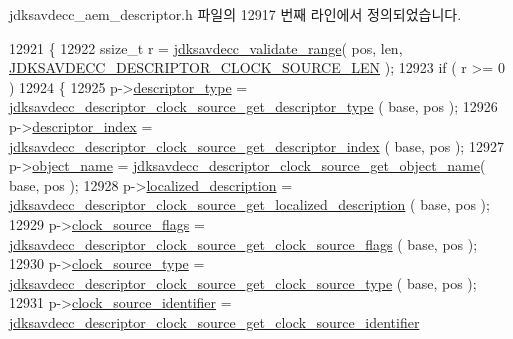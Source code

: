 jdksavdecc\+\_\+aem\+\_\+descriptor.\+h 파일의 12917 번째 라인에서 정의되었습니다.


\begin{DoxyCode}
12921 \{
12922     ssize\_t r = \hyperlink{group__util_ga9c02bdfe76c69163647c3196db7a73a1}{jdksavdecc\_validate\_range}( pos, len, 
      \hyperlink{group__descriptor__clock__source_ga66ee17894f56080a6071a858519f83cd}{JDKSAVDECC\_DESCRIPTOR\_CLOCK\_SOURCE\_LEN} );
12923     \textcolor{keywordflow}{if} ( r >= 0 )
12924     \{
12925         p->\hyperlink{structjdksavdecc__descriptor__clock__source_ab7c32b6c7131c13d4ea3b7ee2f09b78d}{descriptor\_type} = 
      \hyperlink{group__descriptor__clock__source_ga6c7920cb81e474c039654579add3f6f9}{jdksavdecc\_descriptor\_clock\_source\_get\_descriptor\_type}
      ( base, pos );
12926         p->\hyperlink{structjdksavdecc__descriptor__clock__source_a042bbc76d835b82d27c1932431ee38d4}{descriptor\_index} = 
      \hyperlink{group__descriptor__clock__source_ga5b543a9b01054f53161de607189cacb7}{jdksavdecc\_descriptor\_clock\_source\_get\_descriptor\_index}
      ( base, pos );
12927         p->\hyperlink{structjdksavdecc__descriptor__clock__source_a7d1f5945a13863b1762fc6db74fa8f80}{object\_name} = 
      \hyperlink{group__descriptor__clock__source_ga589f9dc289f33c7d3998698d7f3fb096}{jdksavdecc\_descriptor\_clock\_source\_get\_object\_name}( base,
       pos );
12928         p->\hyperlink{structjdksavdecc__descriptor__clock__source_a0926f846ca65a83ad5bb06b4aff8f408}{localized\_description} = 
      \hyperlink{group__descriptor__clock__source_ga850b9367642cb78513cd08cbcebca2e4}{jdksavdecc\_descriptor\_clock\_source\_get\_localized\_description}
      ( base, pos );
12929         p->\hyperlink{structjdksavdecc__descriptor__clock__source_a564b48229d2ee13e7caca2ac09490a0b}{clock\_source\_flags} = 
      \hyperlink{group__descriptor__clock__source_ga446687533424c37008df2804641825cd}{jdksavdecc\_descriptor\_clock\_source\_get\_clock\_source\_flags}
      ( base, pos );
12930         p->\hyperlink{structjdksavdecc__descriptor__clock__source_ae3108efe2ae46da2955a6a8aeb45ea02}{clock\_source\_type} = 
      \hyperlink{group__descriptor__clock__source_ga1d91d1447296699aa5ed39d00026e44e}{jdksavdecc\_descriptor\_clock\_source\_get\_clock\_source\_type}
      ( base, pos );
12931         p->\hyperlink{structjdksavdecc__descriptor__clock__source_ab80a8a949bc506f1690d2326167b3707}{clock\_source\_identifier} = 
      \hyperlink{group__descriptor__clock__source_ga67b1adbe7ed56cf9a954b3f888ac6dcc}{jdksavdecc\_descriptor\_clock\_source\_get\_clock\_source\_identifier}

\end{DoxyCode}
